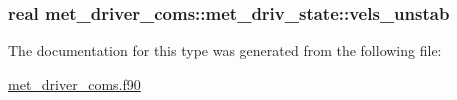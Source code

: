 \subsubsection[{vels\+\_\+unstab}]{\setlength{\rightskip}{0pt plus 5cm}real met\+\_\+driver\+\_\+coms\+::met\+\_\+driv\+\_\+state\+::vels\+\_\+unstab}\label{structmet__driver__coms_1_1met__driv__state_a5237ae89349cfee1060065ed728b8bb1}


The documentation for this type was generated from the following file\+:\begin{DoxyCompactItemize}
\item 
\hyperlink{met__driver__coms_8f90}{met\+\_\+driver\+\_\+coms.\+f90}\end{DoxyCompactItemize}
